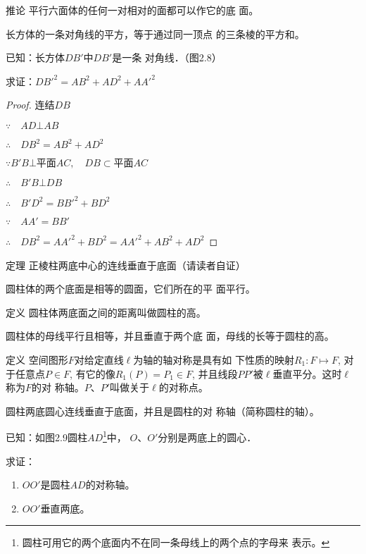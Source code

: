 \begin{blk}
    {推论} 平行六面体的任何一对相对的面都可以作它的底
面。
\end{blk}

\begin{example}
    长方体的一条对角线的平方，等于通过同一顶点
的三条棱的平方和。

已知：长方体$DB'$中$DB'$是一条
对角线．（图2.8）

求证：${DB'}^2=AB^2+AD^2+{AA'}^2$
\end{example}

\begin{proof}
    连结$DB$

$\because\quad  AD\bot AB$

$\therefore\quad DB^2=AB^2+AD^2$

$\because B'B\bot\text{平面}AC,\quad DB\subset \text{平面}AC$
    
$\therefore\quad B'B\bot DB$

$\therefore\quad B'D^2={BB'}^2+BD^2$

$\because\quad AA'=BB'$

$\therefore\quad DB^2={AA'}^2+{BD}^2={AA'}^2+AB^2+AD^2$
\end{proof}

\begin{blk}
   {定理} 正棱柱两底中心的连线垂直于底面（请读者自证）
   
   圆柱体的两个底面是相等的圆面，它们所在的平
面平行。
\end{blk}

\begin{blk}{定义} 
    圆柱体两底面之间的距离叫做圆柱的高。

    圆柱体的母线平行且相等，并且垂直于两个底
面，母线的长等于圆柱的高。
\end{blk}

\begin{blk}{定义}
空间图形$F$对给定直线$\ell$为轴的轴对称是具有如
下性质的映射$R_1:F\mapsto F$, 对于任意点$P\in F$, 有它的像$R_1(P)
=P_1\in F$, 并且线段$PP'$被$\ell$垂直平分。这时$\ell$称为$F$的对
称轴。$P$、$P'$叫做关于$\ell$的对称点。

圆柱两底圆心连线垂直于底面，并且是圆柱的对
称轴（简称圆柱的轴）。
\end{blk}

已知：如图2.9圆柱$AD$\footnote{圆柱可用它的两个底面内不在同一条母线上的两个点的字母来
表示。}中，
$O$、$O'$分别是两底上的圆心．

求证：
\begin{enumerate}
    \item $OO'$是圆柱$AD$的对称轴。
    \item $OO'$垂直两底。
\end{enumerate}

